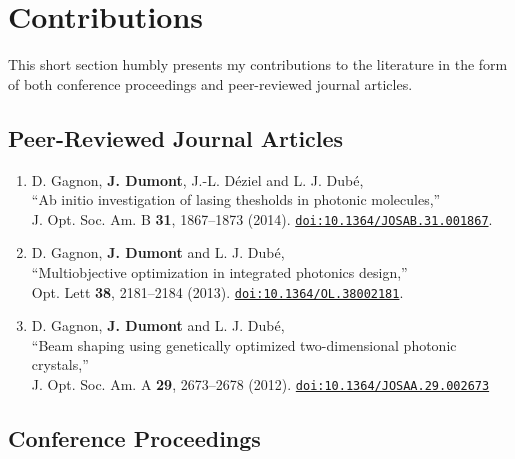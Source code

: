 \chapter*{Contributions}
This short section humbly presents my contributions to the 
literature in the form of both conference proceedings and 
peer-reviewed journal articles. 

\section*{Peer-Reviewed Journal Articles}
\renewcommand*{\thefootnote}{\fnsymbol{footnote}}

\begin{enumerate}
  \item[\cite{GAG2014a}] D. Gagnon, \textbf{J. Dumont}, J.-L. Déziel and L. J. Dubé, \\
	``Ab initio investigation of lasing thesholds in photonic molecules,'' \\ 
	J. Opt. Soc. Am. B \textbf{31}, 1867--1873 (2014).
	\href{http://dx.doi.org/10.1364/JOSAB.31.001867}{\texttt{doi:10.1364/JOSAB.31.001867}}.
  \item[\cite{GAG2013c}]D. Gagnon, \textbf{J. Dumont} and L. J. Dubé, \\
	``Multiobjective optimization in integrated photonics design,''\\
	Opt. Lett \textbf{38}, 2181--2184 (2013). 
	\href{http://dx.doi.org/10.1364/OL.38002181}{\texttt{doi:10.1364/OL.38002181}}.
  \item[\cite{GAG2012}]D. Gagnon, \textbf{J. Dumont} and L. J. Dubé, \\
	``Beam shaping using genetically optimized two-dimensional photonic crystals,''\\
	J. Opt. Soc. Am. A \textbf{29}, 2673--2678 (2012). 
	\href{http://dx.doi.org/10.1364/JOSAA.29.002673}{\texttt{doi:10.1364/JOSAA.29.002673}}
\end{enumerate}

\clearpage
\section*{Conference Proceedings}
\renewcommand*{\thefootnote}{\roman{footnote}}
\setcounter{footnote}{0}

